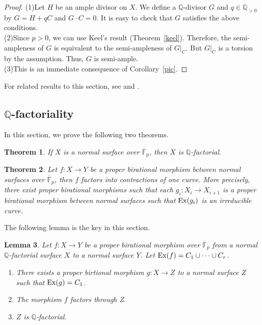 \documentclass[12pt,twoside]{amsart}
\newtheorem{thm}{Theorem}[section]
\newtheorem{lem}[thm]{Lemma}
\theoremstyle{definition}
\newcommand{\Q}{$\mathbb{Q}$}
\newcommand{\ff}{$\overline{\mathbb{F}}_p$}
\begin{document}
\begin{proof}
(1)Let $H$ be an ample divisor on $X$. 
We define a \Q-divisor $G$ and $q\in\mathbb Q_{>0}$ 
by $G=H+qC$ and $G\cdot C=0$. 
It is easy to check that $G$ satisfies the above conditions.\\
(2)Since $p>0$, we can use Keel's result (Theorem~\ref{keel}). 
Therefore, the semi-ampleness of $G$
is equivalent to the semi-ampleness of $G|_C$. 
But $G|_C$ is a torsion by the assumption. 
Thus, $G$ is semi-ample. \\
(3)This is an immediate consequence of Corollary~\ref{pic}. 
\end{proof}

For related results to this section, see \cite{Artin} and \cite{Badescu2}. 

\subsection{\Q-factoriality}

In this section, we prove the following two theorems. 

\begin{thm}\label{Q-factorial}
If $X$ is a normal surface over \ff, then $X$ is \Q-factorial. 
\end{thm}

\begin{thm}\label{decomposition}
Let $f:X \to Y$ be a proper birational morphism 
between normal surfaces over \ff, then 
$f$ factors into contractions of one curve. 
More precisely, there exist proper birational morphisms 
such that each 
$g_i:X_i \to X_{i+1}$ is a proper birational morphism 
between normal surfaces such that ${\rm Ex}(g_i)$ is an irreducible curve.
\end{thm}

The following lemma is the key in this section. 

\begin{lem}
Let $f:X \to Y$ be a proper birational morphism over $\overline{\mathbb{F}}_p$ 
from a normal \Q-factorial surface $X$ to a normal surface $Y$. 
Let ${\rm Ex}(f)=C_1 \cup \dots \cup C_r$. 
\begin{enumerate}
\item{There exists 
a proper birtional morphism $g:X \to Z$ to a normal surface $Z$ 
such that ${\rm Ex}(g)=C_1$.} 
\item{The morphism $f$ factors through Z.}
\item{$Z$ is \Q-factorial.}
\end{enumerate}
\end{lem}
\end{document}
